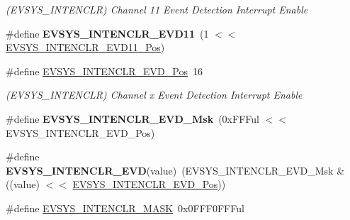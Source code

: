 \begin{DoxyCompactItemize}
\begin{DoxyCompactList}\small\item\em (E\+V\+S\+Y\+S\+\_\+\+I\+N\+T\+E\+N\+C\+L\+R) Channel 11 Event Detection Interrupt Enable \end{DoxyCompactList}\item 
\hypertarget{group___s_a_m_l21___e_v_s_y_s_ga85643ec7dfb60e3395434b50ca7ddc90}{}\#define {\bfseries E\+V\+S\+Y\+S\+\_\+\+I\+N\+T\+E\+N\+C\+L\+R\+\_\+\+E\+V\+D11}~(1 $<$$<$ \hyperlink{group___s_a_m_l21___e_v_s_y_s_ga02702f3214e3b2febafa300d126a0303}{E\+V\+S\+Y\+S\+\_\+\+I\+N\+T\+E\+N\+C\+L\+R\+\_\+\+E\+V\+D11\+\_\+\+Pos})\label{group___s_a_m_l21___e_v_s_y_s_ga85643ec7dfb60e3395434b50ca7ddc90}

\item 
\hypertarget{group___s_a_m_l21___e_v_s_y_s_ga8a3e372d57cf13788515873930cf5657}{}\#define \hyperlink{group___s_a_m_l21___e_v_s_y_s_ga8a3e372d57cf13788515873930cf5657}{E\+V\+S\+Y\+S\+\_\+\+I\+N\+T\+E\+N\+C\+L\+R\+\_\+\+E\+V\+D\+\_\+\+Pos}~16\label{group___s_a_m_l21___e_v_s_y_s_ga8a3e372d57cf13788515873930cf5657}

\begin{DoxyCompactList}\small\item\em (E\+V\+S\+Y\+S\+\_\+\+I\+N\+T\+E\+N\+C\+L\+R) Channel x Event Detection Interrupt Enable \end{DoxyCompactList}\item 
\hypertarget{group___s_a_m_l21___e_v_s_y_s_ga8f32e9de4a9c91b99b05dfede7021443}{}\#define {\bfseries E\+V\+S\+Y\+S\+\_\+\+I\+N\+T\+E\+N\+C\+L\+R\+\_\+\+E\+V\+D\+\_\+\+Msk}~(0x\+F\+F\+Ful $<$$<$ E\+V\+S\+Y\+S\+\_\+\+I\+N\+T\+E\+N\+C\+L\+R\+\_\+\+E\+V\+D\+\_\+\+Pos)\label{group___s_a_m_l21___e_v_s_y_s_ga8f32e9de4a9c91b99b05dfede7021443}

\item 
\hypertarget{group___s_a_m_l21___e_v_s_y_s_ga9f947ba090e6770f6dca2ab683801fe6}{}\#define {\bfseries E\+V\+S\+Y\+S\+\_\+\+I\+N\+T\+E\+N\+C\+L\+R\+\_\+\+E\+V\+D}(value)~(E\+V\+S\+Y\+S\+\_\+\+I\+N\+T\+E\+N\+C\+L\+R\+\_\+\+E\+V\+D\+\_\+\+Msk \& ((value) $<$$<$ \hyperlink{group___s_a_m_l21___e_v_s_y_s_ga8a3e372d57cf13788515873930cf5657}{E\+V\+S\+Y\+S\+\_\+\+I\+N\+T\+E\+N\+C\+L\+R\+\_\+\+E\+V\+D\+\_\+\+Pos}))\label{group___s_a_m_l21___e_v_s_y_s_ga9f947ba090e6770f6dca2ab683801fe6}

\item 
\hypertarget{group___s_a_m_l21___e_v_s_y_s_ga0f90179d426443f298e90124d610acb0}{}\#define \hyperlink{group___s_a_m_l21___e_v_s_y_s_ga0f90179d426443f298e90124d610acb0}{E\+V\+S\+Y\+S\+\_\+\+I\+N\+T\+E\+N\+C\+L\+R\+\_\+\+M\+A\+S\+K}~0x0\+F\+F\+F0\+F\+F\+Ful\label{group___s_a_m_l21___e_v_s_y_s_ga0f90179d426443f298e90124d610acb0}


\end{DoxyCompactItemize}
